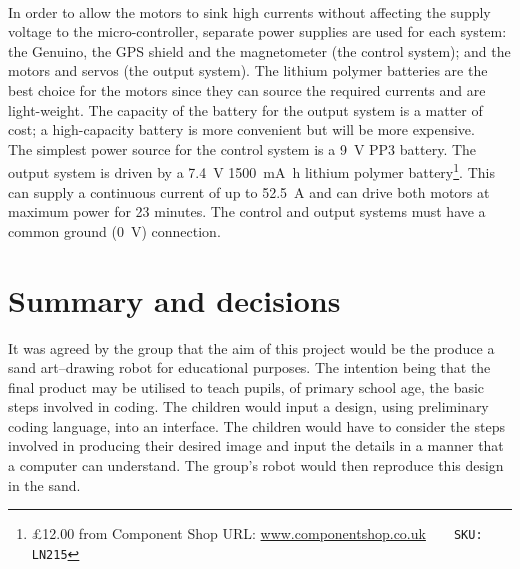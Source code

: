             \paragraph{}In order to allow the motors to sink high currents without affecting the supply voltage to the micro-controller, separate power supplies are used for each system: the \gls{Genuino}, the GPS shield and the \gls{magnetometer} (the control system); and the motors and \glspl{servo} (the output system). The lithium polymer batteries are the best choice for the motors since they can source the required currents and are light-weight. The capacity of the battery for the output system is a matter of cost; a high-capacity battery is more convenient but will be more expensive.\\
            The simplest power source for the control system is a \SI{9}{\volt} PP3 battery. The output system is driven by a \SI{7.4}{\volt} \SI{1500}{\milli\ampere\hour} lithium polymer battery\footnote{\pounds{12.00} from Component Shop \textsc{URL:} \url{www.componentshop.co.uk}~~~~\texttt{SKU: LN215}}. This can supply a continuous current of up to \SI{52.5}{\ampere} and can drive both motors at maximum power for 23 minutes. The control and output systems must have a common ground (\SI{0}{\volt}) connection.

    \label{outline: motors}



\section{Summary and decisions}
    It was agreed by the group that the aim of this project would be the produce a sand art--drawing robot for educational purposes. The intention being that the final product may be utilised to teach pupils, of primary school age, the basic steps involved in coding.
    The children would input a design, using preliminary coding language, into an interface. The children would have to consider the steps involved in producing their desired image and input the details in a manner that a computer can understand. The group's robot would then reproduce this design in the sand.






